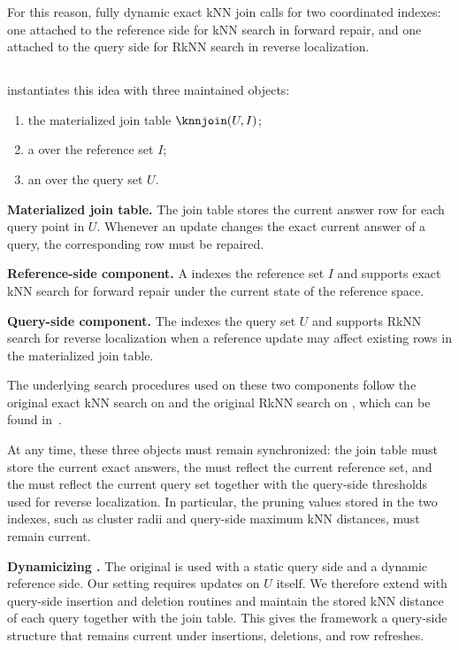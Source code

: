 For this reason, fully dynamic exact kNN join calls for two coordinated indexes: one attached to the reference side for kNN search in forward repair, and one attached to the query side for RkNN search in reverse localization.

\subsection{\dualtree}
\label{subsec:dualtree}

\dualtree instantiates this idea with three maintained objects:
\begin{enumerate}
    \item the materialized join table $\knnjoin(U,I)$;
    \item a \deltatree over the reference set $I$;
    \item an \hdrtree over the query set $U$.
\end{enumerate}

\noindent\textbf{Materialized join table.}
The join table stores the current answer row for each query point in $U$. Whenever an update changes the exact current answer of a query, the corresponding row must be repaired.

\noindent\textbf{Reference-side component.}
A \deltatree indexes the reference set $I$ and supports exact kNN search for forward repair under the current state of the reference space.

\noindent\textbf{Query-side component.}
The \hdrtree indexes the query set $U$ and supports RkNN search for reverse localization when a reference update may affect existing rows in the materialized join table.

The underlying search procedures used on these two components follow the original exact kNN search on \deltatree and the original RkNN search on \hdrtree, which can be found in~\cite{cui2003contorting,yang2014continuous}.

At any time, these three objects must remain synchronized: the join table must store the current exact answers, the \deltatree must reflect the current reference set, and the \hdrtree must reflect the current query set together with the query-side thresholds used for reverse localization. In particular, the pruning values stored in the two indexes, such as cluster radii and query-side maximum kNN distances, must remain current.

\noindent\textbf{Dynamicizing \hdrtree.}
The original \hdrtree is used with a static query side and a dynamic reference side. Our setting requires updates on $U$ itself. We therefore extend \hdrtree with query-side insertion and deletion routines and maintain the stored kNN distance of each query together with the join table. This gives the framework a query-side structure that remains current under insertions, deletions, and row refreshes.

